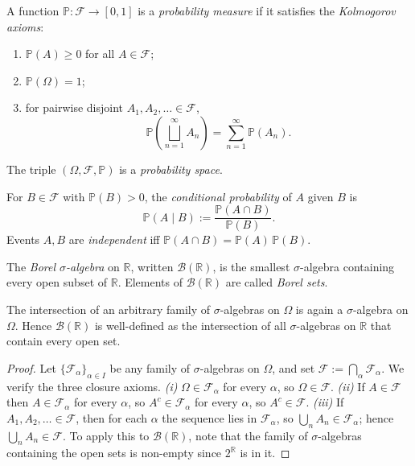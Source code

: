 \begin{definition}
A function $\mathbb{P}: \mathcal{F} \to [0, 1]$ is a \emph{probability measure} if it satisfies the \emph{Kolmogorov axioms}:
\begin{enumerate}
  \item[\textbf{(K1)}] $\mathbb{P}(A) \geq 0$ for all $A \in \mathcal{F}$;
  \item[\textbf{(K2)}] $\mathbb{P}(\Omega) = 1$;
  \item[\textbf{(K3)}] for pairwise disjoint $A_{1}, A_{2}, \ldots \in \mathcal{F}$,
  \[
    \mathbb{P}\!\left(\bigsqcup_{n=1}^{\infty} A_{n}\right) = \sum_{n=1}^{\infty} \mathbb{P}(A_{n}).
  \]
\end{enumerate}
The triple $(\Omega, \mathcal{F}, \mathbb{P})$ is a \emph{probability space}.
\end{definition}

\begin{definition}
For $B \in \mathcal{F}$ with $\mathbb{P}(B) > 0$, the \emph{conditional probability} of $A$ given $B$ is
\[
  \mathbb{P}(A \mid B) := \frac{\mathbb{P}(A \cap B)}{\mathbb{P}(B)}.
\]
Events $A, B$ are \emph{independent} iff $\mathbb{P}(A \cap B) = \mathbb{P}(A)\,\mathbb{P}(B)$.
\end{definition}

\begin{definition}
\label{def:borel}
The \emph{Borel $\sigma$-algebra} on $\mathbb{R}$, written $\mathcal{B}(\mathbb{R})$, is the smallest $\sigma$-algebra containing every open subset of $\mathbb{R}$. Elements of $\mathcal{B}(\mathbb{R})$ are called \emph{Borel sets}.
\end{definition}

\begin{proposition}
\label{prop:borel-exists}
The intersection of an arbitrary family of $\sigma$-algebras on $\Omega$ is again a $\sigma$-algebra on $\Omega$. Hence $\mathcal{B}(\mathbb{R})$ is well-defined as the intersection of all $\sigma$-algebras on $\mathbb{R}$ that contain every open set.
\end{proposition}

\begin{proof}
Let $\{\mathcal{F}_\alpha\}_{\alpha \in I}$ be any family of $\sigma$-algebras on $\Omega$, and set $\mathcal{F} := \bigcap_{\alpha} \mathcal{F}_\alpha$. We verify the three closure axioms. \emph{(i)} $\Omega \in \mathcal{F}_\alpha$ for every $\alpha$, so $\Omega \in \mathcal{F}$. \emph{(ii)} If $A \in \mathcal{F}$ then $A \in \mathcal{F}_\alpha$ for every $\alpha$, so $A^c \in \mathcal{F}_\alpha$ for every $\alpha$, so $A^c \in \mathcal{F}$. \emph{(iii)} If $A_1, A_2, \ldots \in \mathcal{F}$, then for each $\alpha$ the sequence lies in $\mathcal{F}_\alpha$, so $\bigcup_n A_n \in \mathcal{F}_\alpha$; hence $\bigcup_n A_n \in \mathcal{F}$. To apply this to $\mathcal{B}(\mathbb{R})$, note that the family of $\sigma$-algebras containing the open sets is non-empty since $2^\mathbb{R}$ is in it.
\end{proof}

